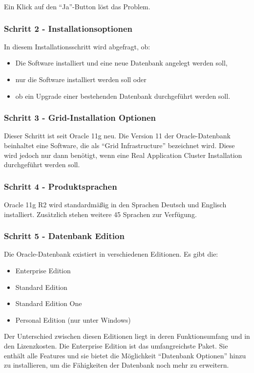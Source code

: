           Ein Klick auf den \enquote{Ja}-Button löst das Problem.

        \subsubsection{Schritt 2 - Installationsoptionen}
          In diesem Installationsschritt wird abgefragt, ob:
          \begin{itemize}
            \item Die Software installiert und eine neue Datenbank angelegt werden soll,
            \item nur die Software installiert werden soll oder
            \item ob ein Upgrade einer bestehenden Datenbank durchgeführt werden soll.
          \end{itemize}
        \subsubsection{Schritt 3 - Grid-Installation Optionen}
          Dieser Schritt ist seit Oracle 11g neu. Die Version 11 der Oracle-Datenbank beinhaltet eine Software, die als \enquote{Grid Infrastructure} bezeichnet wird. Diese wird jedoch nur dann benötigt, wenn eine Real Application Cluster Installation durchgeführt werden soll.
        \subsubsection{Schritt 4 - Produktsprachen}
          Oracle 11g R2 wird standardmäßig in den Sprachen Deutsch und Englisch installiert. Zusätzlich stehen weitere 45 Sprachen zur Verfügung.
        \subsubsection{Schritt 5 - Datenbank Edition}
          Die Oracle-Datenbank existiert in verschiedenen Editionen. Es gibt die:
          \begin{itemize}
            \item Enterprise Edition
            \item Standard Edition
            \item Standard Edition One
            \item Personal Edition (nur unter Windows)
          \end{itemize}
          Der Unterschied zwischen diesen Editionen liegt in deren Funktionsumfang und in den Lizenzkosten. Die Enterprise Edition ist das umfangreichste Paket. Sie enthält alle Features und sie bietet die Möglichkeit \enquote{Datenbank Optionen} hinzu zu installieren, um die Fähigkeiten der Datenbank noch mehr zu erweitern.

